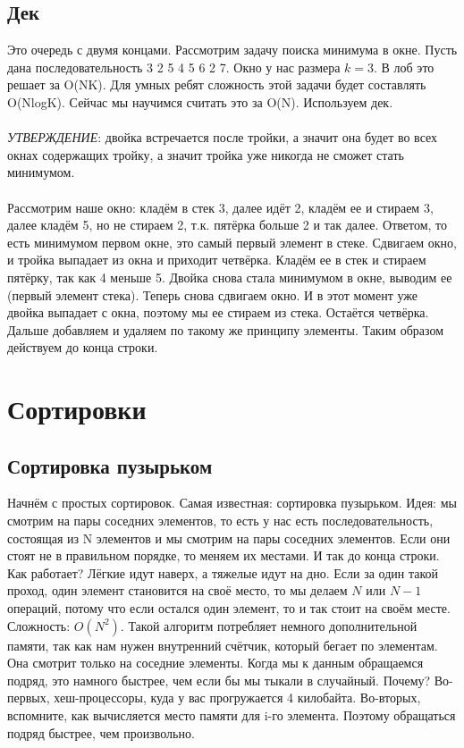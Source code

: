 \documentclass[a4paper,12pt]{article}
\begin{document}
\subsection{Дек}
Это очередь с двумя концами. Рассмотрим задачу поиска минимума в окне. Пусть дана последовательность 3 2 5 4 5 6 2 7. Окно у нас размера $k = 3$. В лоб это решает за O(NK). Для умных ребят сложность этой задачи будет составлять O(NlogK). Сейчас мы научимся считать это за O(N). Используем дек. \\
\\
\textit{УТВЕРЖДЕНИЕ}: двойка встречается после тройки, а значит она будет во всех окнах содержащих тройку, а значит тройка уже никогда не сможет стать минимумом. \\
\\
Рассмотрим наше окно: кладём в стек 3, далее идёт 2, кладём ее и стираем 3, далее кладём 5, но не стираем 2, т.к. пятёрка больше 2 и так далее. Ответом, то есть минимумом первом окне, это самый первый элемент в стеке. Сдвигаем окно, и тройка выпадает из окна и приходит четвёрка. Кладём ее в стек и стираем пятёрку, так как 4 меньше 5. Двойка снова стала минимумом в окне, выводим ее (первый элемент стека). Теперь снова сдвигаем окно. И в этот момент уже двойка выпадает с окна, поэтому мы ее стираем из стека. Остаётся четвёрка. Дальше добавляем и удаляем по такому же принципу элементы. Таким образом действуем до конца строки.
\newpage
\section{Сортировки}
\subsection{Сортировка пузырьком}
Начнём с простых сортировок. Самая известная: сортировка пузырьком. Идея: мы смотрим на пары соседних элементов, то есть у нас есть последовательность, состоящая из N элементов и мы смотрим на пары соседних элементов. Если они стоят не в правильном порядке, то меняем их местами. И так до конца строки. Как работает? Лёгкие идут наверх, а тяжелые идут на дно. Если за один такой проход, один элемент становится на своё место, то мы делаем $N$ или $N - 1$ операций, потому что если остался один элемент, то и так стоит на своём месте. Сложность: $O(N^2)$. Такой алгоритм потребляет немного дополнительной памяти, так как нам нужен внутренний счётчик, который бегает по элементам. Она смотрит только на соседние элементы. Когда мы к данным обращаемся подряд, это намного быстрее, чем если бы мы тыкали в случайный. Почему? Во-первых, хеш-процессоры, куда у вас прогружается 4 килобайта. Во-вторых, вспомните, как вычисляется место памяти для i-го элемента. Поэтому обращаться подряд быстрее, чем произвольно.
\end{document}
